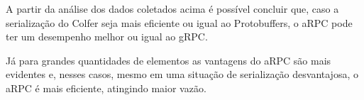 A partir da análise dos dados coletados acima é possível concluir que, caso a serialização do Colfer seja mais eficiente ou igual ao Protobuffers, o aRPC pode ter um desempenho melhor ou igual ao gRPC. 

Já para grandes quantidades de elementos as vantagens do aRPC são mais evidentes e, nesses casos, mesmo em uma situação de serialização desvantajosa, o aRPC é mais eficiente, atingindo maior vazão.
